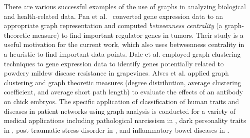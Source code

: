 \documentclass{bmcart}
\begin{document}
There are various successful examples of the use of graphs in analyzing biological and health-related data. 
Pan et al.~\cite{ETV5Tumor} converted gene expression data to an appropriate graph representation and computed \textit{betweenness centrality} (a graph-theoretic measure) to find important regulator genes in tumors. 
Their study is a useful motivation for the current work, which also uses betweenness centrality in a heuristic to find important data points. 
Dale et al. \cite{grapevine} employed graph clustering techniques to gene expression data to identify genes potentially related to powdery mildew disease resistance in grapevines.  
Alves et al. \cite{alves2018graph} applied graph clustering and graph theoretic measures (degree distribution, average clustering coefficient, and average short path length) to evaluate the effects of an antibody on chick embryos. 
The specific application of classification of human traits and diseases in patient networks using graph analysis is conducted for a variety of medical applications including pathological narcissism in \cite{DIPIERRO2018}, dark personality traits in \cite{MARCUS201856}, post-traumatic stress disorder in \cite{akiki2018default}, and inflammatory bowel diseases in \cite{yasser}. 



\end{document}
